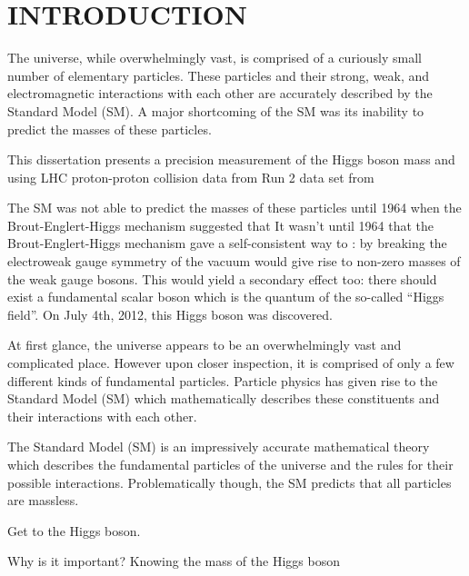 \chapter{INTRODUCTION}

The universe, while overwhelmingly vast, is comprised of a curiously small number of elementary particles.
These particles and their strong, weak, and electromagnetic interactions with each other are accurately described by the Standard Model (SM).
A major shortcoming of the SM was its inability to predict the masses of these particles.

This dissertation presents a precision measurement of the Higgs boson mass and using LHC proton-proton collision data from Run 2  data set from  

The SM was not able to predict the masses of these particles until 1964 when the Brout-Englert-Higgs mechanism suggested that 
It wasn't until 1964 that the Brout-Englert-Higgs mechanism gave a self-consistent way to :
by breaking the electroweak gauge symmetry of the vacuum would give rise to non-zero masses of the weak gauge bosons.
This would yield a secondary effect too:
there should exist a fundamental scalar boson which is the quantum of the so-called ``Higgs field''.
On July 4th, 2012, this Higgs boson was discovered.

At first glance, the universe appears to be an overwhelmingly vast and complicated place.
However upon closer inspection, it is comprised of only a few different kinds of fundamental particles.
Particle physics has given rise to the Standard Model (SM) which mathematically describes these constituents and their interactions with each other.




The Standard Model (SM) is an impressively accurate mathematical theory which describes the fundamental particles of the universe and the rules for their possible interactions.
Problematically though, the SM predicts that all particles are massless.


Get to the Higgs boson.

Why is it important?
Knowing the mass of the Higgs boson 








